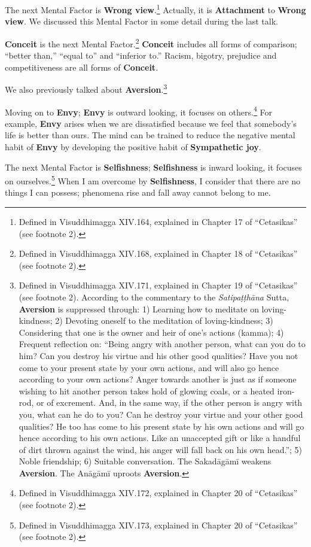 The next Mental Factor is \textbf{Wrong view}.\footnote{Defined in Visuddhimagga XIV.164, explained in Chapter 17 of “Cetasikas” (see footnote 2).} Actually, it is \textbf{Attachment} to \textbf{Wrong view}. We discussed this Mental Factor in some detail during the last talk.

\textbf{Conceit} is the next Mental Factor.\footnote{Defined in Visuddhimagga XIV.168, explained in Chapter 18 of “Cetasikas” (see footnote 2).}  \textbf{Conceit} includes all forms of comparison; “better than,” “equal to” and “inferior to.” Racism, bigotry, prejudice and competitiveness are all forms of \textbf{Conceit}.

We also previously talked about \textbf{Aversion}.\footnote{Defined in Visuddhimagga XIV.171, explained in Chapter 19 of “Cetasikas” (see footnote 2). According to the commentary to the \textit{Satipaṭṭhāna} Sutta, \textbf{Aversion} is suppressed through: 1) Learning how to meditate on loving-kindness; 2) Devoting oneself to the meditation of loving-kindness; 3) Considering that one is the owner and heir of one’s actions (kamma); 4) Frequent reflection on: “Being angry with another person, what can you do to him? Can you destroy his virtue and his other good qualities? Have you not come to your present state by your own actions, and will also go hence according to your own actions? Anger towards another is just as if someone wishing to hit another person takes hold of glowing coals, or a heated iron-rod, or of excrement. And, in the same way, if the other person is angry with you, what can he do to you? Can he destroy your virtue and your other good qualities? He too has come to his present state by his own actions and will go hence according to his own actions. Like an unaccepted gift or like a handful of dirt thrown against the wind, his anger will fall back on his own head.”; 5) Noble friendship; 6) Suitable conversation. The Sakadāgāmī weakens \textbf{Aversion}. The Anāgāmī uproots \textbf{Aversion}.}

Moving on to \textbf{Envy}; \textbf{Envy} is outward looking, it focuses on others.\footnote{Defined in Visuddhimagga XIV.172, explained in Chapter 20 of “Cetasikas” (see footnote 2).} For example, \textbf{Envy} arises when we are dissatisfied because we feel that somebody’s life is better than ours. The mind can be trained to reduce the negative mental habit of \textbf{Envy} by developing the positive habit of \textbf{Sympathetic joy}.

The next Mental Factor is \textbf{Selfishness}; \textbf{Selfishness} is inward looking, it focuses on ourselves.\footnote{Defined in Visuddhimagga XIV.173, explained in Chapter 20 of “Cetasikas” (see footnote 2).} When I am overcome by \textbf{Selfishness}, I consider that there are no things I can possess; phenomena rise and fall away cannot belong to me.

